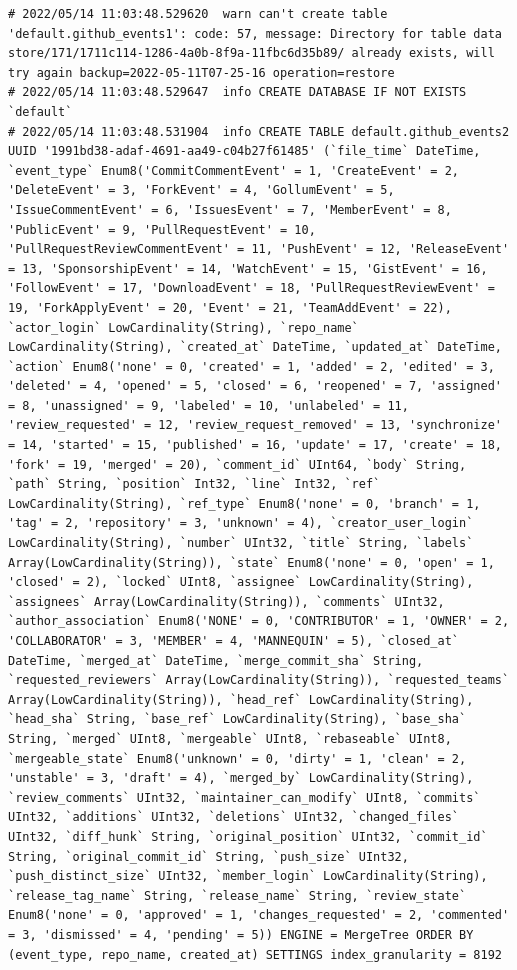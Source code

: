 \begin{verbatim}
# 2022/05/14 11:03:48.529620  warn can't create table 'default.github_events1': code: 57, message: Directory for table data store/171/1711c114-1286-4a0b-8f9a-11fbc6d35b89/ already exists, will try again backup=2022-05-11T07-25-16 operation=restore
# 2022/05/14 11:03:48.529647  info CREATE DATABASE IF NOT EXISTS `default`
# 2022/05/14 11:03:48.531904  info CREATE TABLE default.github_events2 UUID '1991bd38-adaf-4691-aa49-c04b27f61485' (`file_time` DateTime, `event_type` Enum8('CommitCommentEvent' = 1, 'CreateEvent' = 2, 'DeleteEvent' = 3, 'ForkEvent' = 4, 'GollumEvent' = 5, 'IssueCommentEvent' = 6, 'IssuesEvent' = 7, 'MemberEvent' = 8, 'PublicEvent' = 9, 'PullRequestEvent' = 10, 'PullRequestReviewCommentEvent' = 11, 'PushEvent' = 12, 'ReleaseEvent' = 13, 'SponsorshipEvent' = 14, 'WatchEvent' = 15, 'GistEvent' = 16, 'FollowEvent' = 17, 'DownloadEvent' = 18, 'PullRequestReviewEvent' = 19, 'ForkApplyEvent' = 20, 'Event' = 21, 'TeamAddEvent' = 22), `actor_login` LowCardinality(String), `repo_name` LowCardinality(String), `created_at` DateTime, `updated_at` DateTime, `action` Enum8('none' = 0, 'created' = 1, 'added' = 2, 'edited' = 3, 'deleted' = 4, 'opened' = 5, 'closed' = 6, 'reopened' = 7, 'assigned' = 8, 'unassigned' = 9, 'labeled' = 10, 'unlabeled' = 11, 'review_requested' = 12, 'review_request_removed' = 13, 'synchronize' = 14, 'started' = 15, 'published' = 16, 'update' = 17, 'create' = 18, 'fork' = 19, 'merged' = 20), `comment_id` UInt64, `body` String, `path` String, `position` Int32, `line` Int32, `ref` LowCardinality(String), `ref_type` Enum8('none' = 0, 'branch' = 1, 'tag' = 2, 'repository' = 3, 'unknown' = 4), `creator_user_login` LowCardinality(String), `number` UInt32, `title` String, `labels` Array(LowCardinality(String)), `state` Enum8('none' = 0, 'open' = 1, 'closed' = 2), `locked` UInt8, `assignee` LowCardinality(String), `assignees` Array(LowCardinality(String)), `comments` UInt32, `author_association` Enum8('NONE' = 0, 'CONTRIBUTOR' = 1, 'OWNER' = 2, 'COLLABORATOR' = 3, 'MEMBER' = 4, 'MANNEQUIN' = 5), `closed_at` DateTime, `merged_at` DateTime, `merge_commit_sha` String, `requested_reviewers` Array(LowCardinality(String)), `requested_teams` Array(LowCardinality(String)), `head_ref` LowCardinality(String), `head_sha` String, `base_ref` LowCardinality(String), `base_sha` String, `merged` UInt8, `mergeable` UInt8, `rebaseable` UInt8, `mergeable_state` Enum8('unknown' = 0, 'dirty' = 1, 'clean' = 2, 'unstable' = 3, 'draft' = 4), `merged_by` LowCardinality(String), `review_comments` UInt32, `maintainer_can_modify` UInt8, `commits` UInt32, `additions` UInt32, `deletions` UInt32, `changed_files` UInt32, `diff_hunk` String, `original_position` UInt32, `commit_id` String, `original_commit_id` String, `push_size` UInt32, `push_distinct_size` UInt32, `member_login` LowCardinality(String), `release_tag_name` String, `release_name` String, `review_state` Enum8('none' = 0, 'approved' = 1, 'changes_requested' = 2, 'commented' = 3, 'dismissed' = 4, 'pending' = 5)) ENGINE = MergeTree ORDER BY (event_type, repo_name, created_at) SETTINGS index_granularity = 8192

\end{verbatim}
